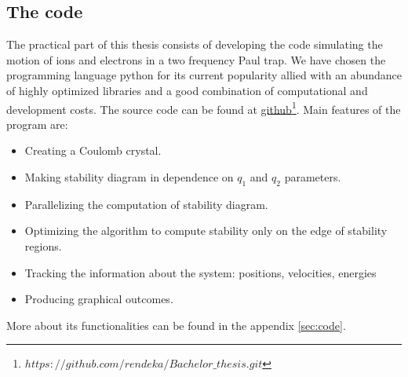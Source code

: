 \subsection{The code}
The practical part of this thesis consists of developing the code simulating the motion of ions and electrons in a two frequency Paul trap. We have chosen the programming language python for its current popularity allied with an abundance of highly optimized libraries and a good combination of computational and development costs. The source code can be found at \href{https://github.com/rendeka/Bachelor_thesis.git}{github\footnote{\href{https://github.com/rendeka/Bachelor_thesis.git}{$https://github.com/rendeka/Bachelor\_thesis.git$}}.} Main features of the program are:
\begin{itemize}
	\item Creating a Coulomb crystal.
	\item Making stability diagram in dependence on $q_1$ and $q_2$ parameters.
	\item Parallelizing the computation of stability diagram. 
	\item Optimizing the algorithm to compute stability only on the edge of stability regions.
	\item Tracking the information about the system: positions, velocities, energies
	\item Producing graphical outcomes.
\end{itemize}
More about its functionalities can be found in the appendix \ref{sec:code}.